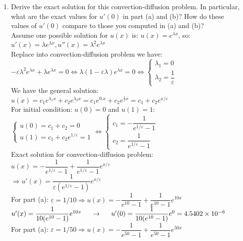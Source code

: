 \documentclass[14pt,a4paper]{article}
\begin{document}
\begin{enumerate}
	\label{3c}
	\item Derive the exact solution for this convection-diffusion problem. In particular, what are the exact values for $u'(0)$ in part (a) and (b)? How do these values of $u'(0)$ compare to those you computed in (a) and (b)?\\
	Assume one possible solution for $u(x)$ is: $u(x) = e^{\lambda x}$, so: $u'(x) = \lambda e^{\lambda x}, u''(x) = \lambda^2e^{\lambda x}$\\
	Replace into convection-diffusion problem we have:\\
	\hspace*{2cm} $-\varepsilon\lambda^2e^{\lambda x} + \lambda e^{\lambda x} = 0 \Leftrightarrow \lambda(1 - \varepsilon\lambda)e^{\lambda x} = 0 \Leftrightarrow \begin{cases} \lambda_1 = 0 \\ \lambda_2 = \dfrac{1}{\varepsilon} \end{cases}$\\
	We have the general solution: $u(x) = c_1e^{\lambda_1x} + c_2e^{\lambda_2x} = c_1e^{0.x} + c_2e^{\frac{1}{\varepsilon}x} = c_1 + c_2e^{x/\varepsilon}$\\
	For initial condition: $u(0) = 0$ and $u(1) = 1$: $\begin{cases} u(0) = c_1 + c_2 = 0 \\ u(1) = c_1 + c_2e^{1/\varepsilon} = 1 \end{cases} \Leftrightarrow \begin{cases} c_1 = -\dfrac{1}{e^{1/\varepsilon}-1} \\ c_2 = \dfrac{1}{e^{1/\varepsilon}-1} \end{cases} $\\
	Exact solution for convection-diffusion problem: $u(x) = -\dfrac{1}{e^{1/\varepsilon}-1} + \dfrac{1}{e^{1/\varepsilon}-1}e^{x/\varepsilon}$\\
	$\Rightarrow u'(x) = \dfrac{1}{\varepsilon(e^{1/\varepsilon}-1)}e^{x/\varepsilon}$\\
	For part (a): $\varepsilon = 1/10 \Rightarrow u(x) = - \dfrac{1}{e^{10}-1} + \dfrac{1}{e^{10}-1}e^{10x}$\\
	\hspace*{2.5cm} $u'(x) = \dfrac{1}{10(e^{10}-1)}e^{10x} \hspace{0.5cm} \rightarrow \hspace{0.5cm} u'(0) = \dfrac{1}{10(e^{10}-1)}e^0 = 4.5402 \times 10^{-6} $ \\
	For part (a): $\varepsilon = 1/50 \Rightarrow u(x) = - \dfrac{1}{e^{50}-1} + \dfrac{1}{e^{50}-1}e^{50x}$\\

\end{enumerate}
\end{document}
